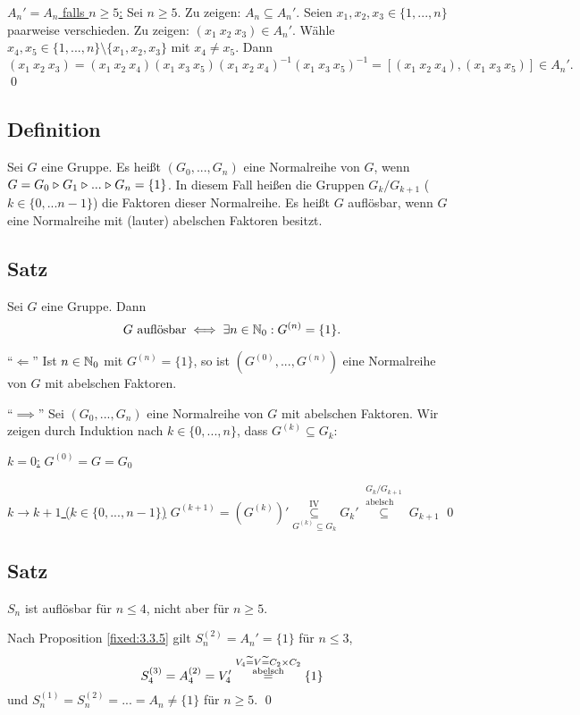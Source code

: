 \underline{$A_n'=A_n$ falls $n\ge5$:} Sei $n\ge5$. Zu zeigen: $A_n\subseteq A_n'$. Seien $x_1,x_2,x_3\in\{1,...,n\}$ paarweise verschieden. Zu zeigen: $(x_1\ x_2\ x_3)\in A_n'$. Wähle $x_4,x_5\in\{1,...,n\}\setminus\{x_1,x_2,x_3\}$ mit $x_4\ne x_5$. Dann
$$
	(x_1\ x_2\ x_3)
	=(x_1\ x_2\ x_4)(x_1\ x_3\ x_5)(x_1\ x_2\ x_4)^{-1}(x_1\ x_3\ x_5)^{-1}
	=[(x_1\ x_2\ x_4),(x_1\ x_3\ x_5)]\in A_n'.
$$ \qed

\subsection{Definition} Sei $G$ eine Gruppe. Es heißt $(G_0,...,G_n)$ eine Normalreihe von $G$, wenn $G=G_0\mathrel\triangleright G_1\mathrel\triangleright...\mathrel\triangleright G_n=\{1\}$. In diesem Fall heißen die Gruppen $G_k/G_{k+1}$ ($k\in\{0,... n-1\}$) die Faktoren dieser Normalreihe. Es heißt $G$ auflösbar, wenn $G$ eine Normalreihe mit (lauter) abelschen Faktoren besitzt.

\subsection{Satz} Sei $G$ eine Gruppe. Dann
$$\text{$G$ auflösbar}\iff\exists n\in\mathbb N_0:G^{(n)}=\{1\}.$$

\proof "`$\Longleftarrow$"' Ist $n\in\mathbb N_0$ mit $G^{(n)}=\{1\}$, so ist $(G^{(0)},...,G^{(n)})$ eine Normalreihe von $G$ mit abelschen Faktoren.

"`$\implies$"' Sei $(G_0,...,G_n)$ eine Normalreihe von $G$ mit abelschen Faktoren. Wir zeigen durch Induktion nach $k\in\{0,...,n\}$, dass $G^{(k)}\subseteq G_k$:

\underline{$k=0$:} $G^{(0)}=G=G_0$

\underline{$k\to k+1$ \quad ($k\in\{0,...,n-1\}$)} \quad $G^{(k+1)}=(G^{(k)})' \overset{\text{IV}}{\underset{G^{(k)}\subseteq G_k}\subseteq} G_k'
\overset{\substack{G_k/G_{k+1} \\ \text{abelsch}}}\subseteq G_{k+1}$ \qed

\subsection{Satz} $S_n$ ist auflösbar für $n\le4$, nicht aber für $n\ge5$.

\proof Nach Proposition \ref{fixed:3.3.5} gilt $S_n^{(2)}=A_n'=\{1\}$ für $n\le3$,
$$S_4^{(3)}=A_4^{(2)}=V_4'\overset{\substack{V_4 \mathrel{\widetilde{=}} V \mathrel{\widetilde{=}} C_2\times C_2\\ \text{abelsch}}}=\{1\}$$
und $S_n^{(1)}=S_n^{(2)}=...=A_n\ne\{1\}$ für $n\ge5$. \qed

